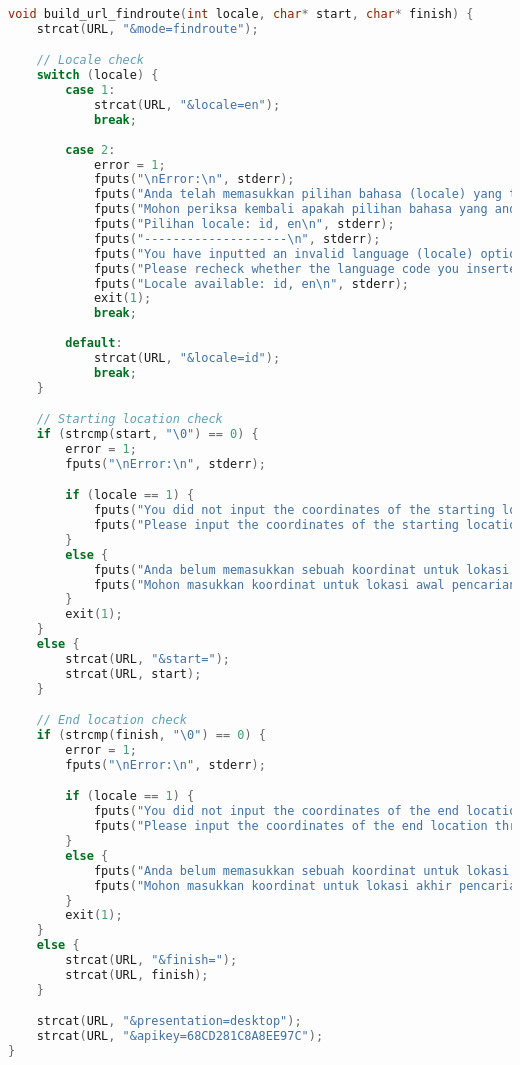\begin{lstlisting}[label={appdx:A-buildurl-findroute}, language=C, caption=\texttt{build\textunderscore url\textunderscore findroute()}]
void build_url_findroute(int locale, char* start, char* finish) {
    strcat(URL, "&mode=findroute");

    // Locale check
    switch (locale) {
        case 1:
            strcat(URL, "&locale=en");
            break;
        
        case 2:
            error = 1;
            fputs("\nError:\n", stderr);
            fputs("Anda telah memasukkan pilihan bahasa (locale) yang tidak valid.\n", stderr);
            fputs("Mohon periksa kembali apakah pilihan bahasa yang anda masukkan valid atau tidak.\n", stderr);
            fputs("Pilihan locale: id, en\n", stderr);
            fputs("--------------------\n", stderr);
            fputs("You have inputted an invalid language (locale) option.\n", stderr);
            fputs("Please recheck whether the language code you inserted was supported or not.\n", stderr);
            fputs("Locale available: id, en\n", stderr);
            exit(1);
            break;
        
        default:
            strcat(URL, "&locale=id");
            break;
    }

    // Starting location check
    if (strcmp(start, "\0") == 0) {
        error = 1;
        fputs("\nError:\n", stderr);

        if (locale == 1) {
            fputs("You did not input the coordinates of the starting location.\n", stderr);
            fputs("Please input the coordinates of the starting location through the corresponding option.\n", stderr);
        }
        else {
            fputs("Anda belum memasukkan sebuah koordinat untuk lokasi awal.\n", stderr);
            fputs("Mohon masukkan koordinat untuk lokasi awal pencarian rute melalui opsi yang sesuai.\n", stderr);
        }
        exit(1);
    }
    else {
        strcat(URL, "&start=");
        strcat(URL, start);
    }

    // End location check
    if (strcmp(finish, "\0") == 0) {
        error = 1;
        fputs("\nError:\n", stderr);

        if (locale == 1) {
            fputs("You did not input the coordinates of the end location.\n", stderr);
            fputs("Please input the coordinates of the end location through the corresponding option.\n", stderr);
        }
        else {
            fputs("Anda belum memasukkan sebuah koordinat untuk lokasi akhir.\n", stderr);
            fputs("Mohon masukkan koordinat untuk lokasi akhir pencarian rute melalui opsi yang sesuai.\n", stderr);
        }
        exit(1);
    }
    else {
        strcat(URL, "&finish=");
        strcat(URL, finish);
    }

    strcat(URL, "&presentation=desktop");
    strcat(URL, "&apikey=68CD281C8A8EE97C");
}
\end{lstlisting}

